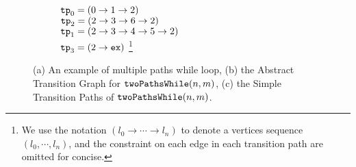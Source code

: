 {\begin{figure}
\begin{subfigure}{.45\textwidth}
\begin{centering}
        \caption{}
    \end{centering}
\end{subfigure}
{\small
\begin{subfigure}{.25\textwidth}
\begin{centering}
        $\mathtt{tp}_0 = (0 \to 1 \to 2)$ \\
        $\mathtt{tp}_2 = (2 \to 3 \to 6 \to 2)$ \\ 
        $\mathtt{tp}_1 = (2 \to 3 \to 4 \to 5 \to 2)$ \\
        $\mathtt{tp}_3 = (2 \to \mathtt{ex})$
        \footnote{We use the notation $(l_0 \to \cdots \to l_n)$ to denote a vertices sequence $(l_0, \cdots, l_n)$, and the constraint on each edge in
        each transition path are omitted for concise.}
    \caption{}
\end{centering}
\end{subfigure}
}
    \caption{
    (a) An example of multiple paths while loop,
    (b) the Abstract Transition Graph for $\mathtt{twoPathsWhile}(n, m)$,
    (c) the Simple Transition Paths of $\mathtt{twoPathsWhile}(n, m)$.}
        \label{fig:whileTwoCounters-overview}
    \end{figure}
    }


